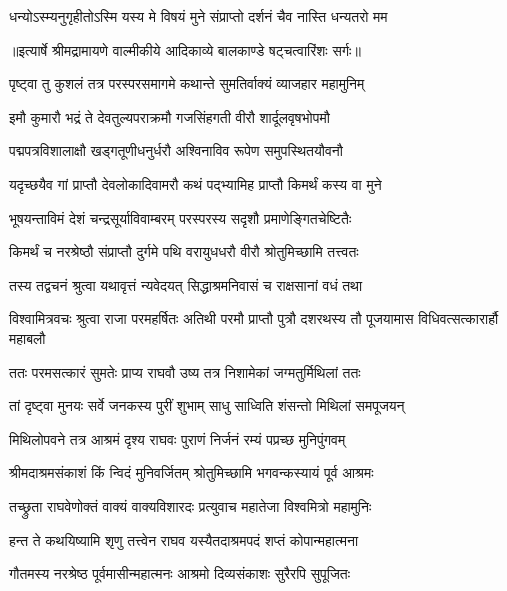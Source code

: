 \twolineshloka
{धन्योऽस्म्यनुगृहीतोऽस्मि यस्य मे विषयं मुने}
{संप्राप्तो दर्शनं चैव नास्ति धन्यतरो मम} %


{॥इत्यार्षे श्रीमद्रामायणे वाल्मीकीये आदिकाव्ये बालकाण्डे षट्चत्वारिंशः सर्गः॥}


\twolineshloka
{पृष्ट्वा तु कुशलं तत्र परस्परसमागमे}
{कथान्ते सुमतिर्वाक्यं व्याजहार महामुनिम्} %

\twolineshloka
{इमौ कुमारौ भद्रं ते देवतुल्यपराक्रमौ}
{गजसिंहगती वीरौ शार्दूलवृषभोपमौ} %

\twolineshloka
{पद्मपत्रविशालाक्षौ खड्गतूणीधनुर्धरौ}
{अश्विनाविव रूपेण समुपस्थितयौवनौ} %

\twolineshloka
{यदृच्छयैव गां प्राप्तौ देवलोकादिवामरौ}
{कथं पद्भ्यामिह प्राप्तौ किमर्थं कस्य वा मुने} %

\twolineshloka
{भूषयन्ताविमं देशं चन्द्रसूर्याविवाम्बरम्}
{परस्परस्य सदृशौ प्रमाणेङ्गितचेष्टितैः} %

\twolineshloka
{किमर्थं च नरश्रेष्ठौ संप्राप्तौ दुर्गमे पथि}
{वरायुधधरौ वीरौ श्रोतुमिच्छामि तत्त्वतः} %

\twolineshloka
{तस्य तद्वचनं श्रुत्वा यथावृत्तं न्यवेदयत्}
{सिद्धाश्रमनिवासं च राक्षसानां वधं तथा} %

\threelineshloka
{विश्वामित्रवचः श्रुत्वा राजा परमहर्षितः}
{अतिथी परमौ प्राप्तौ पुत्रौ दशरथस्य तौ}
{पूजयामास विधिवत्सत्कारार्हौ महाबलौ} %

\twolineshloka
{ततः परमसत्कारं सुमतेः प्राप्य राघवौ}
{उष्य तत्र निशामेकां जग्मतुर्मिथिलां ततः} %

\twolineshloka
{तां दृष्ट्वा मुनयः सर्वे जनकस्य पुरीं शुभाम्}
{साधु साध्विति शंसन्तो मिथिलां समपूजयन्} %

\twolineshloka
{मिथिलोपवने तत्र आश्रमं दृश्य राघवः}
{पुराणं निर्जनं रम्यं पप्रच्छ मुनिपुंगवम्} %

\twolineshloka
{श्रीमदाश्रमसंकाशं किं न्विदं मुनिवर्जितम्}
{श्रोतुमिच्छामि भगवन्कस्यायं पूर्व आश्रमः} %

\twolineshloka
{तच्छ्रुता राघवेणोक्तं वाक्यं वाक्यविशारदः}
{प्रत्युवाच महातेजा विश्वमित्रो महामुनिः} %

\twolineshloka
{हन्त ते कथयिष्यामि शृणु तत्त्वेन राघव}
{यस्यैतदाश्रमपदं शप्तं कोपान्महात्मना} %

\twolineshloka
{गौतमस्य नरश्रेष्ठ पूर्वमासीन्महात्मनः}
{आश्रमो दिव्यसंकाशः सुरैरपि सुपूजितः} %

